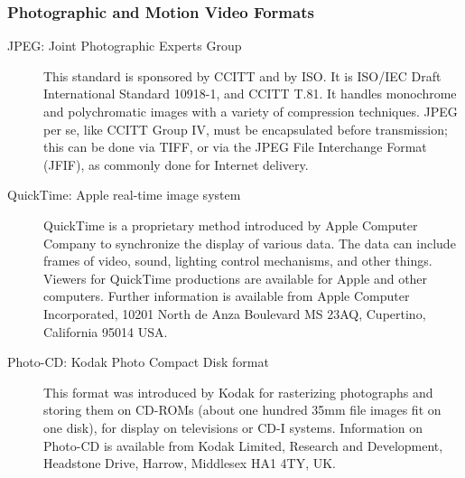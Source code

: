 \subsubsection[{Photographic and Motion Video Formats}]{Photographic and Motion Video Formats}\label{FTGRAMPEG}\begin{description}

\item[{JPEG: Joint Photographic Experts Group}]This standard is sponsored by CCITT and by ISO. It is ISO/IEC Draft International Standard 10918-1, and CCITT T.81. It handles monochrome and polychromatic images with a variety of compression techniques. JPEG per se, like CCITT Group IV, must be encapsulated before transmission; this can be done via TIFF, or via the JPEG File Interchange Format (JFIF), as commonly done for Internet delivery. 
\item[{QuickTime: Apple real-time image system}]QuickTime is a proprietary method introduced by Apple Computer Company to synchronize the display of various data. The data can include frames of video, sound, lighting control mechanisms, and other things. Viewers for QuickTime productions are available for Apple and other computers. Further information is available from Apple Computer Incorporated, 10201 North de Anza Boulevard MS 23AQ, Cupertino, California 95014 USA. 
\item[{Photo-CD: Kodak Photo Compact Disk format}]This format was introduced by Kodak for rasterizing photographs and storing them on CD-ROMs (about one hundred 35mm file images fit on one disk), for display on televisions or CD-I systems. Information on Photo-CD is available from Kodak Limited, Research and Development, Headstone Drive, Harrow, Middlesex HA1 4TY, UK. 

\end{description}
